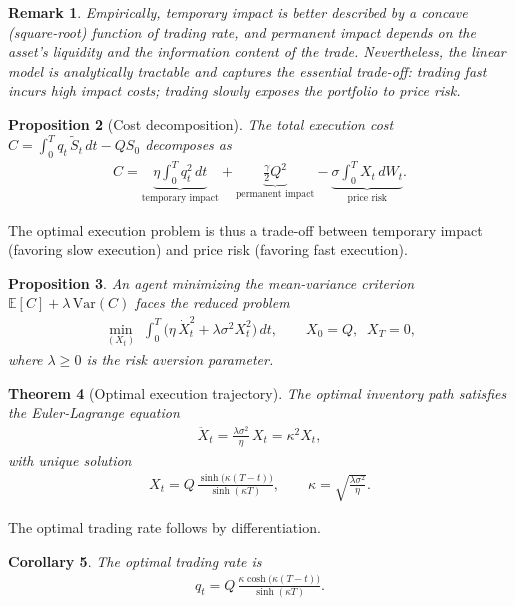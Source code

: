 \documentclass{report}
\theoremstyle{spacedplain}
\newtheorem{theorem}{Theorem}[section]
\newtheorem{proposition}[theorem]{Proposition}
\newtheorem{corollary}[theorem]{Corollary}
\theoremstyle{spaceddefinition}
\theoremstyle{spacedremark}
\newtheorem{remark}[theorem]{Remark}
\begin{document}
\begin{remark}
Empirically, temporary impact is better described by a concave (square-root) function of trading rate, and permanent impact depends on the asset's liquidity and the information content of the trade. Nevertheless, the linear model is analytically tractable and captures the essential trade-off: trading fast incurs high impact costs; trading slowly exposes the portfolio to price risk.
\end{remark}

\begin{proposition}[Cost decomposition]
The total execution cost $C = \int_0^T q_t\,\widetilde{S}_t\,dt - QS_0$ decomposes as
\begin{align}
    C = \underbrace{\eta\int_0^T q_t^2\,dt}_{\text{temporary impact}} + \underbrace{\frac{\gamma}{2}Q^2}_{\text{permanent impact}} - \underbrace{\sigma\int_0^T X_t\,dW_t}_{\text{price risk}}.
\end{align}
\end{proposition}

The optimal execution problem is thus a trade-off between temporary impact (favoring slow execution) and price risk (favoring fast execution).

\begin{proposition}
An agent minimizing the mean-variance criterion $\mathbb{E}[C] + \lambda\,\text{Var}(C)$ faces the reduced problem
\begin{align}
    \min_{(X_t)}\;\int_0^T\bigl(\eta\,\dot{X}_t^2 + \lambda\sigma^2 X_t^2\bigr)\,dt, \qquad X_0 = Q,\;\; X_T = 0,
\end{align}
where $\lambda \geq 0$ is the risk aversion parameter.
\end{proposition}

\begin{theorem}[Optimal execution trajectory]
The optimal inventory path satisfies the Euler-Lagrange equation
\begin{align}
    \ddot{X}_t = \frac{\lambda\sigma^2}{\eta}\,X_t = \kappa^2 X_t,
\end{align}
with unique solution
\begin{align}
    X_t = Q\,\frac{\sinh\bigl(\kappa(T-t)\bigr)}{\sinh(\kappa T)}, \qquad \kappa = \sqrt{\frac{\lambda\sigma^2}{\eta}}.
\end{align}
\end{theorem}

The optimal trading rate follows by differentiation.

\begin{corollary}
The optimal trading rate is
\begin{align}
    q_t = Q\,\frac{\kappa\cosh\bigl(\kappa(T-t)\bigr)}{\sinh(\kappa T)}.
\end{align}
\end{corollary}
\end{document}
